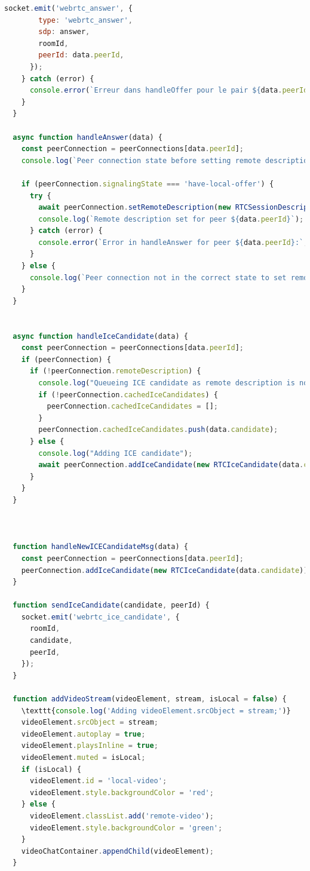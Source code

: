 \documentclass[12pt, a4paper, oneside]{Thesis}
\begin{document}
\begin{lstlisting}[language=JavaScript, caption={Fonctions Principales}, label=Fonctions Principales]
      socket.emit('webrtc_answer', {
        type: 'webrtc_answer',
        sdp: answer,
        roomId,
        peerId: data.peerId,
      });
    } catch (error) {
      console.error(`Erreur dans handleOffer pour le pair ${data.peerId}:`, error);
    }
  }

  async function handleAnswer(data) {
    const peerConnection = peerConnections[data.peerId];
    console.log(`Peer connection state before setting remote description: ${peerConnection.signalingState}`);

    if (peerConnection.signalingState === 'have-local-offer') {
      try {
        await peerConnection.setRemoteDescription(new RTCSessionDescription(data.sdp));
        console.log(`Remote description set for peer ${data.peerId}`);
      } catch (error) {
        console.error(`Error in handleAnswer for peer ${data.peerId}:`, error);
      }
    } else {
      console.log(`Peer connection not in the correct state to set remote description, current state: ${peerConnection.signalingState}`);
    }
  }


  async function handleIceCandidate(data) {
    const peerConnection = peerConnections[data.peerId];
    if (peerConnection) {
      if (!peerConnection.remoteDescription) {
        console.log("Queueing ICE candidate as remote description is not yet set");
        if (!peerConnection.cachedIceCandidates) {
          peerConnection.cachedIceCandidates = [];
        }
        peerConnection.cachedIceCandidates.push(data.candidate);
      } else {
        console.log("Adding ICE candidate");
        await peerConnection.addIceCandidate(new RTCIceCandidate(data.candidate));
      }
    }
  }



  function handleNewICECandidateMsg(data) {
    const peerConnection = peerConnections[data.peerId];
    peerConnection.addIceCandidate(new RTCIceCandidate(data.candidate));
  }

  function sendIceCandidate(candidate, peerId) {
    socket.emit('webrtc_ice_candidate', {
      roomId,
      candidate,
      peerId,
    });
  }

  function addVideoStream(videoElement, stream, isLocal = false) {
    \texttt{console.log('Adding videoElement.srcObject = stream;')}
    videoElement.srcObject = stream;
    videoElement.autoplay = true;
    videoElement.playsInline = true;
    videoElement.muted = isLocal;
    if (isLocal) {
      videoElement.id = 'local-video';
      videoElement.style.backgroundColor = 'red'; 
    } else {
      videoElement.classList.add('remote-video');
      videoElement.style.backgroundColor = 'green'; 
    }
    videoChatContainer.appendChild(videoElement);
  }


\end{lstlisting}
\end{document}
